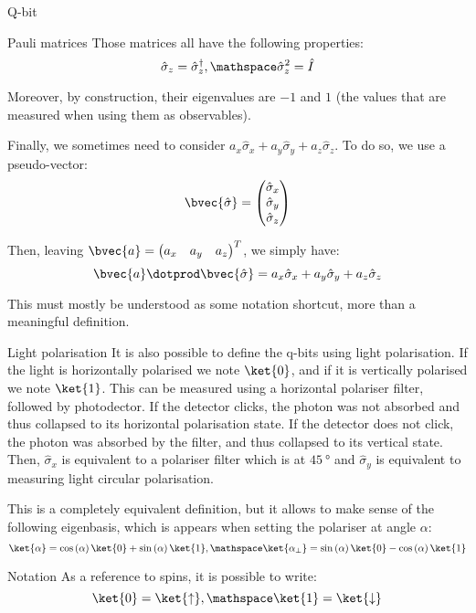 \documentclass[a4paper]{article}
\begin{document}
\begin{parag}{Q-bit}
\begin{subparag}{Pauli matrices}
        Those matrices all have the following properties:
        \[\hat{\sigma}_z = \hat{\sigma}_z^{\dagger}, \mathspace \hat{\sigma}_z^2 = \hat{I}\]

        Moreover, by construction, their eigenvalues are $-1$ and $1$ (the values that are measured when using them as observables).

        Finally, we sometimes need to consider $a_x \hat{\sigma}_x + a_y \hat{\sigma}_y + a_z \hat{\sigma}_z$. To do so, we use a pseudo-vector: 
        \[\bvec{\hat{\sigma}} = \begin{pmatrix} \hat{\sigma}_x \\ \hat{\sigma}_y \\ \hat{\sigma}_z \end{pmatrix} \]
        
        Then, leaving $\bvec{a} = \begin{pmatrix} a_x & a_y & a_z \end{pmatrix} ^T$, we simply have: 
        \[\bvec{a} \dotprod \bvec{\hat{\sigma}} = a_x \hat{\sigma}_x + a_y \hat{\sigma}_y + a_z \hat{\sigma}_z\]
        
        This must mostly be understood as some notation shortcut, more than a meaningful definition.
    \end{subparag}

    \begin{subparag}{Light polarisation}
        It is also possible to define the q-bits using light polarisation. If the light is horizontally polarised we note $\ket{0}$, and if it is vertically polarised we note $\ket{1}$. This can be measured using a horizontal polariser filter, followed by photodector. If the detector clicks, the photon was not absorbed and thus collapsed to its horizontal polarisation state. If the detector does not click, the photon was absorbed by the filter, and thus collapsed to its vertical state. Then, $\hat{\sigma}_x$ is equivalent to a polariser filter which is at $\SI{45}{\degree}$ and $\hat{\sigma}_y$ is equivalent to measuring light circular polarisation.

        This is a completely equivalent definition, but it allows to make sense of the following eigenbasis, which is appears when setting the polariser at angle $\alpha$:
        \[\ket{\alpha} = \cos\left(\alpha\right) \ket{0} + \sin\left(\alpha\right)\ket{1}, \mathspace \ket{\alpha_{\perp}} = \sin\left(\alpha\right) \ket{0} - \cos\left(\alpha\right) \ket{1}\]
    \end{subparag}

    \begin{subparag}{Notation}
        As a reference to spins, it is possible to write: 
        \[\ket{0} = \ket{\uparrow}, \mathspace \ket{1} = \ket{\downarrow}\]
    \end{subparag}
\end{parag}
\end{document}
